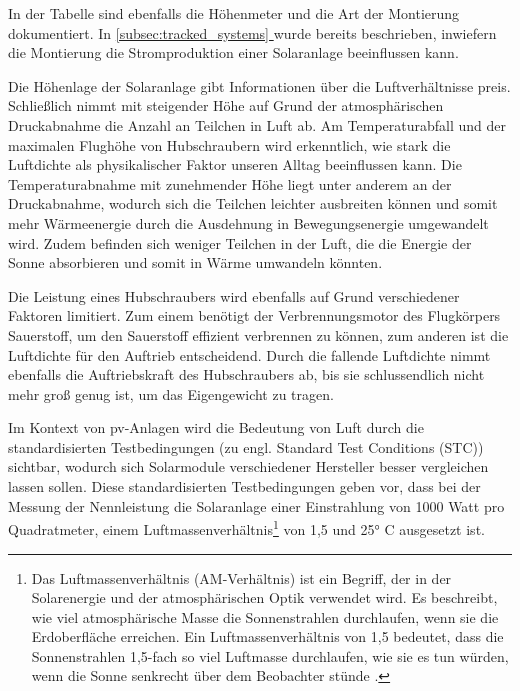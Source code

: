 \documentclass[12pt, a4paper]{article}
\newcommand*{\fullref}[1]{\hyperref[{#1}]{\autoref*{#1} \nameref*{#1}}}
\begin{document}
In der Tabelle sind ebenfalls die Höhenmeter und die Art der Montierung dokumentiert. In \fullref{subsec:tracked_systems} wurde bereits beschrieben, inwiefern die Montierung die Stromproduktion einer Solaranlage beeinflussen kann. 

Die Höhenlage der Solaranlage gibt Informationen über die Luftverhältnisse preis. Schließlich nimmt mit steigender Höhe auf Grund der atmosphärischen Druckabnahme die Anzahl an Teilchen in Luft ab. Am Temperaturabfall und der maximalen Flughöhe von Hubschraubern wird erkenntlich, wie stark die Luftdichte als physikalischer Faktor unseren Alltag beeinflussen kann. Die Temperaturabnahme mit zunehmender Höhe liegt unter anderem an der Druckabnahme, wodurch sich die Teilchen leichter ausbreiten können und somit mehr Wärmeenergie durch die Ausdehnung in Bewegungsenergie umgewandelt wird. Zudem befinden sich weniger Teilchen in der Luft, die die Energie der Sonne absorbieren und somit in Wärme umwandeln könnten.


Die Leistung eines Hubschraubers wird ebenfalls auf Grund verschiedener Faktoren limitiert. Zum einem benötigt der Verbrennungsmotor des Flugkörpers Sauerstoff, um den Sauerstoff effizient verbrennen zu können, zum anderen ist die Luftdichte für den Auftrieb entscheidend. Durch die fallende Luftdichte nimmt ebenfalls die Auftriebskraft des Hubschraubers ab, bis sie schlussendlich nicht mehr groß genug ist, um das Eigengewicht zu tragen.

Im Kontext von \ac{pv}-Anlagen wird die Bedeutung von Luft durch die standardisierten Testbedingungen (zu engl. Standard Test Conditions (STC)) sichtbar, wodurch sich Solarmodule verschiedener Hersteller besser vergleichen lassen sollen. Diese standardisierten Testbedingungen geben vor, dass bei der Messung der Nennleistung die Solaranlage einer Einstrahlung von 1000 Watt pro Quadratmeter, einem Luftmassenverhältnis\footnote{Das Luftmassenverhältnis (AM-Verhältnis) ist ein Begriff, der in der Solarenergie und der atmosphärischen Optik verwendet wird. Es beschreibt, wie viel atmosphärische Masse die Sonnenstrahlen durchlaufen, wenn sie die Erdoberfläche erreichen. Ein Luftmassenverhältnis von 1,5 bedeutet, dass die Sonnenstrahlen 1,5-fach so viel Luftmasse durchlaufen, wie sie es tun würden, wenn die Sonne senkrecht über dem Beobachter stünde .} von 1,5 und 25° C ausgesetzt ist.
\end{document}
